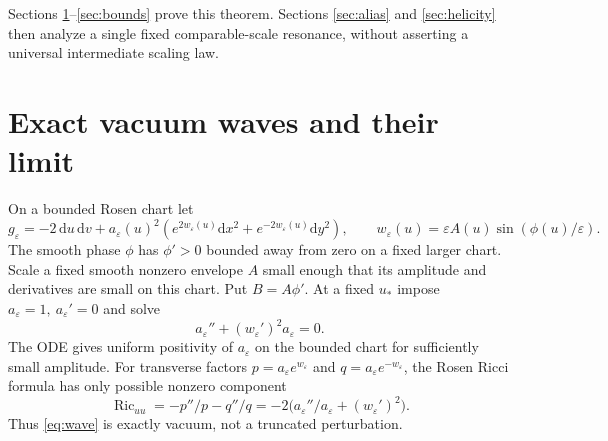 \documentclass[11pt]{article}
\DeclareMathOperator{\Ric}{Ric}
\newcommand{\dd}{\mathrm d}
\begin{document}
Sections \ref{sec:waves}--\ref{sec:bounds} prove this theorem.
Sections \ref{sec:alias} and \ref{sec:helicity} then analyze a single
fixed comparable-scale resonance, without asserting a universal
intermediate scaling law.

\section{Exact vacuum waves and their limit}\label{sec:waves}

On a bounded Rosen chart let
\begin{equation}
 g_\varepsilon=-2\,\dd u\,\dd v
     +a_\varepsilon(u)^2
       \left(e^{2w_\varepsilon(u)}\dd x^2
                      +e^{-2w_\varepsilon(u)}\dd y^2\right),\qquad
 w_\varepsilon(u)=\varepsilon A(u)
                           \sin(\phi(u)/\varepsilon).
 \label{eq:wave}
\end{equation}
The smooth phase \(\phi\) has \(\phi'>0\) bounded away from zero
on a fixed larger chart. Scale a fixed smooth nonzero envelope
\(A\) small enough that its amplitude and derivatives are small
on this chart. Put \(B=A\phi'\). At a fixed \(u_*\) impose
\(a_\varepsilon=1,\ a_\varepsilon'=0\) and solve
\begin{equation}
        a_\varepsilon''+(w_\varepsilon')^2a_\varepsilon=0.
 \label{eq:vac}
\end{equation}
The ODE gives uniform positivity of \(a_\varepsilon\) on the
bounded chart for sufficiently small amplitude. For transverse
factors \(p=a_\varepsilon e^{w_\varepsilon}\) and
\(q=a_\varepsilon e^{-w_\varepsilon}\), the Rosen Ricci formula
has only possible nonzero component
\[
       \Ric_{uu}=-p''/p-q''/q
                   =-2\big(a_\varepsilon''/a_\varepsilon
                                    +(w_\varepsilon')^2\big).
\]
Thus \eqref{eq:wave} is exactly vacuum, not a truncated perturbation.
\end{document}

